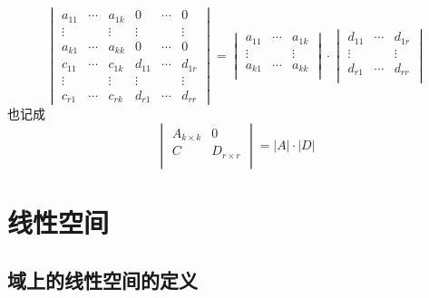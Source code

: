\begin{Corollary}
$$
\begin{vmatrix}
a_{11} & \cdots & a_{1k} & 0      & \cdots & 0 \\
\vdots &        & \vdots & \vdots &        & \vdots \\
a_{k1} & \cdots & a_{kk} & 0      & \cdots & 0 \\
c_{11} & \cdots & c_{1k} & d_{11} & \cdots & d_{1r} \\
\vdots &        & \vdots & \vdots &        & \vdots \\
c_{r1} & \cdots & c_{rk} & d_{r1} & \cdots & d_{rr} 
\end{vmatrix} = \begin{vmatrix}
a_{11} & \cdots & a_{1k}  \\
\vdots &        & \vdots  \\
a_{k1} & \cdots & a_{kk} \\
\end{vmatrix} \cdot
\begin{vmatrix}
d_{11} & \cdots & d_{1r}  \\
\vdots &        & \vdots  \\
d_{r1} & \cdots & d_{rr} \\
\end{vmatrix}
$$
也记成
$$
\begin{vmatrix}
A_{k \times k} & 0 \\
C & D_{r \times r} \\
\end{vmatrix} = |A| \cdot |D|
$$
\end{Corollary}

\section{线性空间}
\subsection{域上的线性空间的定义}


